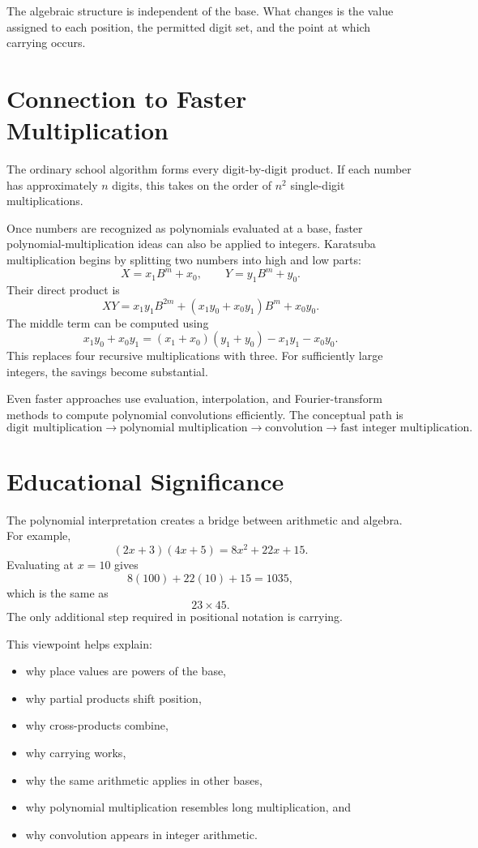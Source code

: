 \documentclass[11pt]{article}
\begin{document}
The algebraic structure is independent of the base. What changes is the value assigned to each position, the permitted digit set, and the point at which carrying occurs.

\section{Connection to Faster Multiplication}

The ordinary school algorithm forms every digit-by-digit product. If each number has approximately $n$ digits, this takes on the order of $n^2$ single-digit multiplications.

Once numbers are recognized as polynomials evaluated at a base, faster polynomial-multiplication ideas can also be applied to integers. Karatsuba multiplication begins by splitting two numbers into high and low parts:
\[
X=x_1B^m+x_0,
\qquad
Y=y_1B^m+y_0.
\]
Their direct product is
\[
XY=x_1y_1B^{2m}+(x_1y_0+x_0y_1)B^m+x_0y_0.
\]
The middle term can be computed using
\[
x_1y_0+x_0y_1
=(x_1+x_0)(y_1+y_0)-x_1y_1-x_0y_0.
\]
This replaces four recursive multiplications with three. For sufficiently large integers, the savings become substantial.

Even faster approaches use evaluation, interpolation, and Fourier-transform methods to compute polynomial convolutions efficiently. The conceptual path is
\[
\text{digit multiplication}
\longrightarrow
\text{polynomial multiplication}
\longrightarrow
\text{convolution}
\longrightarrow
\text{fast integer multiplication}.
\]

\section{Educational Significance}

The polynomial interpretation creates a bridge between arithmetic and algebra. For example,
\[
(2x+3)(4x+5)=8x^2+22x+15.
\]
Evaluating at $x=10$ gives
\[
8(100)+22(10)+15=1035,
\]
which is the same as
\[
23\times45.
\]
The only additional step required in positional notation is carrying.

This viewpoint helps explain:
\begin{itemize}
\item why place values are powers of the base,
\item why partial products shift position,
\item why cross-products combine,
\item why carrying works,
\item why the same arithmetic applies in other bases,
\item why polynomial multiplication resembles long multiplication, and
\item why convolution appears in integer arithmetic.
\end{itemize}
\end{document}
